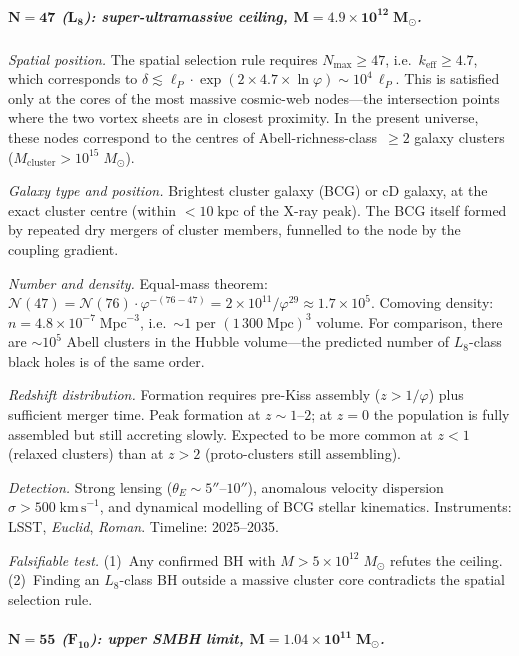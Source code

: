 \documentclass[12pt,a4paper]{article}
\begin{document}
\subparagraph{$\boldsymbol{N = 47}$ ($\boldsymbol{L_8}$): super-ultramassive ceiling, $\boldsymbol{M = 4.9 \times 10^{12}\;M_\odot}$.}

\textit{Spatial position.}\; The spatial selection rule requires $N_{\max} \geq 47$, i.e.\ $k_{\mathrm{eff}} \geq 4.7$, which corresponds to $\delta \lesssim \ell_P \cdot \exp(2 \times 4.7 \times \ln\varphi) \sim 10^4\,\ell_P$.  This is satisfied only at the cores of the most massive cosmic-web nodes---the intersection points where the two vortex sheets are in closest proximity.  In the present universe, these nodes correspond to the centres of Abell-richness-class~$\geq 2$ galaxy clusters ($M_{\mathrm{cluster}} > 10^{15}\;M_\odot$).

\textit{Galaxy type and position.}\; Brightest cluster galaxy (BCG) or cD galaxy, at the exact cluster centre (within $<10\;\mathrm{kpc}$ of the X-ray peak).  The BCG itself formed by repeated dry mergers of cluster members, funnelled to the node by the coupling gradient.

\textit{Number and density.}\; Equal-mass theorem: $\mathcal{N}(47) = \mathcal{N}(76) \cdot \varphi^{-(76-47)} = 2 \times 10^{11}/\varphi^{29} \approx 1.7 \times 10^{5}$.  Comoving density: $n = 4.8 \times 10^{-7}\;\mathrm{Mpc}^{-3}$, i.e.\ $\sim 1$ per $(1\,300\;\mathrm{Mpc})^3$ volume.  For comparison, there are $\sim 10^5$ Abell clusters in the Hubble volume---the predicted number of $L_8$-class black holes is of the same order.

\textit{Redshift distribution.}\; Formation requires pre-Kiss assembly ($z > 1/\varphi$) plus sufficient merger time.  Peak formation at $z \sim 1$--$2$; at $z = 0$ the population is fully assembled but still accreting slowly.  Expected to be more common at $z < 1$ (relaxed clusters) than at $z > 2$ (proto-clusters still assembling).

\textit{Detection.}\; Strong lensing ($\theta_E \sim 5''$--$10''$), anomalous velocity dispersion $\sigma > 500\;\mathrm{km\,s}^{-1}$, and dynamical modelling of BCG stellar kinematics.  Instruments: LSST, \emph{Euclid}, \emph{Roman}.  Timeline: 2025--2035.

\textit{Falsifiable test.}\; (1)~Any confirmed BH with $M > 5 \times 10^{12}\;M_\odot$ refutes the ceiling.  (2)~Finding an $L_8$-class BH outside a massive cluster core contradicts the spatial selection rule.

\subparagraph{$\boldsymbol{N = 55}$ ($\boldsymbol{F_{10}}$): upper SMBH limit, $\boldsymbol{M = 1.04 \times 10^{11}\;M_\odot}$.}
\end{document}
